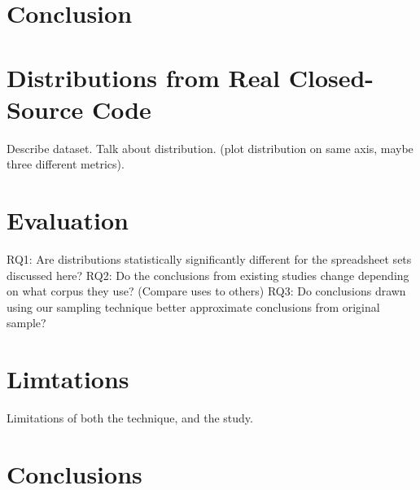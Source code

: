 \documentclass{sig-alternate} %
\begin{document}
\section{Conclusion}

\section{Distributions from Real Closed-Source Code}

Describe dataset.
Talk about distribution. (plot distribution on same axis, maybe three different metrics).

\section{Evaluation}

RQ1: Are distributions statistically significantly different for the spreadsheet sets discussed here?
RQ2: Do the conclusions from existing studies change depending on what corpus they use? (Compare uses to others)
RQ3: Do conclusions drawn using our sampling technique better approximate conclusions from original sample?

\section{Limtations}

Limitations of both the technique, and the study.

\section{Conclusions}
\end{document}
